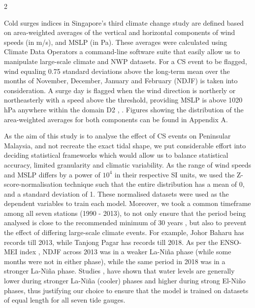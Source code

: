 \documentclass[12pt]{article}
\begin{document}
\begin{multicols}{2}
    \begin{paragraph}
        \noindent Cold surges indices in Singapore's third climate change study \cite{NEA_2024} are defined based on area-weighted averages of the vertical and horizontal components of wind speeds (in m/s), and MSLP (in Pa). These averages were calculated using Climate Data Operators \cite{Schulzweida2023_CDO} a command-line software suite that easily allow us to manipulate large-scale climate and NWP datasets. For a CS event to be flagged, wind equaling 0.75 standard deviations above the long-term mean over the months of November, December, January and February (NDJF) is taken into consideration. A surge day is flagged when the wind direction is northerly or northeasterly with a speed above the threshold, providing MSLP is above 1020 hPa anywhere within the domain D2 \cite{Lim2017_MonsoonRainfall}, \cite{NEA_2024}. Figures showing the distribution of the area-weighted averages for both components can be found in Appendix A.
    \end{paragraph}

    \begin{paragraph}
        \noindent As the aim of this study is to analyse the effect of CS events on Peninsular Malaysia, and not recreate the exact tidal shape, we put considerable effort into deciding statistical frameworks which would allow us to balance statistical accuracy, limited granularity and climatic variability. As the range of wind speeds and MSLP differs by a power of $10^{4}$ in their respective SI units, we used the Z-score-normalisation technique such that the entire distribution has a mean of 0, and a standard deviation of 1. These normalised datasets were used as the dependent variables to train each model. Moreover, we took a common timeframe among all seven stations (1990 - 2013), to not only ensure that the period being analysed is close to the recommended minimum of 30 years \cite{Rasmussen2018_SeaLevelImpacts}, but also to prevent the effect of differing large-scale climate events. For example, Johor Baharu has records till 2013, while Tanjong Pagar has records till 2018. As per the ENSO-MEI index \cite{Wolter2018_MEI}, NDJF across 2013 was in a weaker La-Ni\~na phase (while some months were not in either phase), while the same period in 2018 was in a stronger La-Ni\~na phase. Studies \cite{Dieng2014}, \cite{Han_Huang_2008} have shown that water levels are generally lower during stronger La-Ni\~na (cooler) phases and higher during strong El-Ni\~no phases, thus justifying our choice to ensure that the model is trained on datasets of equal length for all seven tide gauges.
    \end{paragraph}


\end{multicols}
\end{document}
